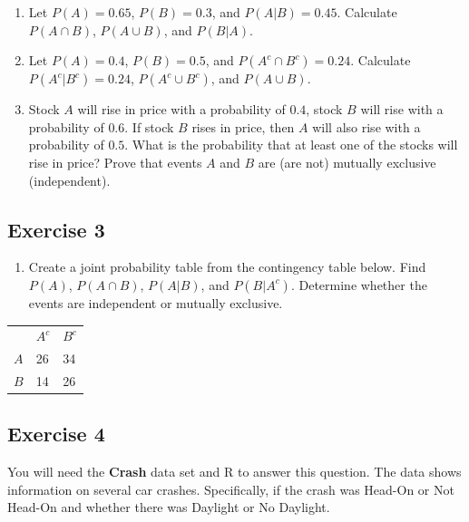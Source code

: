 \documentclass[
  letterpaper,
  DIV=11,
  numbers=noendperiod]{scrreprt}
\providecommand{\tightlist}{%
  \setlength{\itemsep}{0pt}\setlength{\parskip}{0pt}}\usepackage{longtable,booktabs,array}
\begin{document}
\begin{enumerate}
\def\labelenumi{\arabic{enumi}.}
\item
  Let \(P(A)=0.65\), \(P(B)=0.3\), and \(P(A|B)=0.45\). Calculate
  \(P(A \cap B)\), \(P(A \cup B)\), and \(P(B|A)\).
\item
  Let \(P(A)=0.4\), \(P(B)=0.5\), and \(P(A^c \cap B^c)=0.24\).
  Calculate \(P(A^c|B^c)=0.24\), \(P(A^c \cup B^c)\), and
  \(P(A \cup B)\).
\item
  Stock \(A\) will rise in price with a probability of \(0.4\), stock
  \(B\) will rise with a probability of \(0.6\). If stock \(B\) rises in
  price, then \(A\) will also rise with a probability of \(0.5\). What
  is the probability that at least one of the stocks will rise in price?
  Prove that events \(A\) and \(B\) are (are not) mutually exclusive
  (independent).
\end{enumerate}

\hypertarget{exercise-3-14}{%
\subsection*{Exercise 3}\label{exercise-3-14}}

\begin{enumerate}
\def\labelenumi{\arabic{enumi}.}
\tightlist
\item
  Create a joint probability table from the contingency table below.
  Find \(P(A)\), \(P(A \cap B)\), \(P(A|B)\), and \(P(B|A^c)\).
  Determine whether the events are independent or mutually exclusive.
\end{enumerate}

\begin{longtable}[]{@{}lll@{}}
\toprule()
\endhead
& \(A^c\) & \(B^c\) \\
\(A\) & 26 & 34 \\
\(B\) & 14 & 26 \\
\bottomrule()
\end{longtable}

\hypertarget{exercise-4-4}{%
\subsection*{Exercise 4}\label{exercise-4-4}}

You will need the \textbf{Crash} data set and R to answer this question.
The data shows information on several car crashes. Specifically, if the
crash was Head-On or Not Head-On and whether there was Daylight or No
Daylight.
\end{document}
